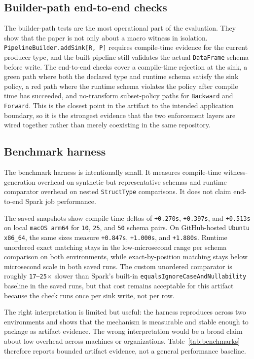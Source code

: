 \subsection{Builder-path end-to-end checks}

The builder-path tests are the most operational part of the evaluation. They show that the paper is not only about a macro witness in isolation. \texttt{PipelineBuilder.addSink[R, P]} requires compile-time evidence for the current producer type, and the built pipeline still validates the actual \texttt{DataFrame} schema before write. The end-to-end checks cover a compile-time rejection at the sink, a green path where both the declared type and runtime schema satisfy the sink policy, a red path where the runtime schema violates the policy after compile time has succeeded, and no-transform subset-policy paths for \texttt{Backward} and \texttt{Forward}. This is the closest point in the artifact to the intended application boundary, so it is the strongest evidence that the two enforcement layers are wired together rather than merely coexisting in the same repository.

\subsection{Benchmark harness}

The benchmark harness is intentionally small. It measures compile-time witness-generation overhead on synthetic but representative schemas and runtime comparator overhead on nested \texttt{StructType} comparisons. It does not claim end-to-end Spark job performance.

The saved snapshots show compile-time deltas of \texttt{+0.270s}, \texttt{+0.397s}, and \texttt{+0.513s} on local \texttt{macOS arm64} for \texttt{10}, \texttt{25}, and \texttt{50} schema pairs. On GitHub-hosted \texttt{Ubuntu x86\_64}, the same sizes measure \texttt{+0.847s}, \texttt{+1.000s}, and \texttt{+1.880s}. Runtime unordered exact matching stays in the low-microsecond range per schema comparison on both environments, while exact-by-position matching stays below microsecond scale in both saved runs. The custom unordered comparator is roughly \texttt{17--25$\times$} slower than Spark's built-in \texttt{equalsIgnoreCaseAndNullability} baseline in the saved runs, but that cost remains acceptable for this artifact because the check runs once per sink write, not per row.

The right interpretation is limited but useful: the harness reproduces across two environments and shows that the mechanism is measurable and stable enough to package as artifact evidence. The wrong interpretation would be a broad claim about low overhead across machines or organizations. Table~\ref{tab:benchmarks} therefore reports bounded artifact evidence, not a general performance baseline.

